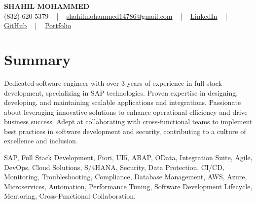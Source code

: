 \documentclass[letterpaper,10pt]{article}
\begin{document}
\begin{center}
    {\fontsize{14pt}{12pt}\selectfont \textbf{\MakeUppercase{Shahil Mohammed}}}\\ \vspace{2pt}
    \fontsize{10pt}{12pt}\selectfont (832) 620-5379 ~ | ~ \href{mailto:shahilmohammed14786@gmail.com}{shahilmohammed14786@gmail.com} ~ | ~  
    \href{https://www.linkedin.com/in/shahil-mohammed-9652931a1/}{\color{blue}\underline{LinkedIn}}  ~ | ~ 
    \href{https://github.com/freakbeast14}{\color{blue}\underline{GitHub}} ~ | ~ 
    \href{https://shahil-mohammed.netlify.app/}{\color{blue}\underline{Portfolio}}
    \vspace{-8pt}
\end{center}

\section{Summary}
\vspace{-2pt}\fontsize{8pt}{9pt}\selectfont
Dedicated software engineer with over 3 years of experience in full-stack development, specializing in SAP technologies. Proven expertise in designing, developing, and maintaining scalable applications and integrations. Passionate about leveraging innovative solutions to enhance operational efficiency and drive business success. Adept at collaborating with cross-functional teams to implement best practices in software development and security, contributing to a culture of excellence and inclusion.
\vspace{-5pt}
 
{\fontsize{1pt}{1pt}\selectfont\color{white}
SAP, Full Stack Development, Fiori, UI5, ABAP, OData, Integration Suite, Agile, DevOps, Cloud Solutions, S/4HANA, Security, Data Protection, CI/CD, Monitoring, Troubleshooting, Compliance, Database Management, AWS, Azure, Microservices, Automation, Performance Tuning, Software Development Lifecycle, Mentoring, Cross-Functional Collaboration.
}
\vspace{-8pt}

\vspace{-2pt}
\end{document}
